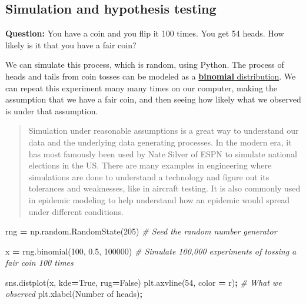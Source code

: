 \documentclass[
  letterpaper,
]{scrbook}
\newenvironment{Shaded}{\begin{snugshade}}{\end{snugshade}}
\newcommand{\CommentTok}[1]{\textcolor[rgb]{0.56,0.35,0.01}{\textit{#1}}}
\newcommand{\DecValTok}[1]{\textcolor[rgb]{0.00,0.00,0.81}{#1}}
\newcommand{\FloatTok}[1]{\textcolor[rgb]{0.00,0.00,0.81}{#1}}
\newcommand{\NormalTok}[1]{#1}
\newcommand{\OperatorTok}[1]{\textcolor[rgb]{0.81,0.36,0.00}{\textbf{#1}}}
\newcommand{\StringTok}[1]{\textcolor[rgb]{0.31,0.60,0.02}{#1}}
\newcommand{\VariableTok}[1]{\textcolor[rgb]{0.00,0.00,0.00}{#1}}
\begin{document}
\hypertarget{simulation-and-hypothesis-testing}{%
\subsection{Simulation and hypothesis testing}\label{simulation-and-hypothesis-testing}}

\textbf{Question:} You have a coin and you flip it 100 times. You get 54 heads. How likely is it that you have a fair coin?

We can simulate this process, which is random, using Python. The process of heads and tails from coin tosses can be modeled as a \href{https://en.wikipedia.org/wiki/Binomial_distribution}{\textbf{binomial} distribution}. We can repeat this experiment many many times on our computer, making the assumption that we have a fair coin, and then seeing how likely what we observed is under that assumption.

\begin{quote}
Simulation under reasonable assumptions is a great way to understand our data and the underlying data generating processes. In the modern era, it has most famously been used by Nate Silver of ESPN to simulate national elections in the US. There are many examples in engineering where simulations are done to understand a technology and figure out its tolerances and weaknesses, like in aircraft testing. It is also commonly used in epidemic modeling to help understand how an epidemic would spread under different conditions.
\end{quote}

\begin{Shaded}
\begin{Highlighting}[]
\NormalTok{rng }\OperatorTok{=}\NormalTok{ np.random.RandomState(}\DecValTok{205}\NormalTok{) }\CommentTok{\# Seed the random number generator}

\NormalTok{x }\OperatorTok{=}\NormalTok{ rng.binomial(}\DecValTok{100}\NormalTok{, }\FloatTok{0.5}\NormalTok{, }\DecValTok{100000}\NormalTok{) }\CommentTok{\# Simulate 100,000 experiments of tossing a fair coin 100 times}

\NormalTok{sns.distplot(x, kde}\OperatorTok{=}\VariableTok{True}\NormalTok{, rug}\OperatorTok{=}\VariableTok{False}\NormalTok{)}
\NormalTok{plt.axvline(}\DecValTok{54}\NormalTok{, color }\OperatorTok{=} \StringTok{\textquotesingle{}r\textquotesingle{}}\NormalTok{)}\OperatorTok{;} \CommentTok{\# What we observed}
\NormalTok{plt.xlabel(}\StringTok{\textquotesingle{}Number of heads\textquotesingle{}}\NormalTok{)}\OperatorTok{;}
\end{Highlighting}
\end{Shaded}
\end{document}
